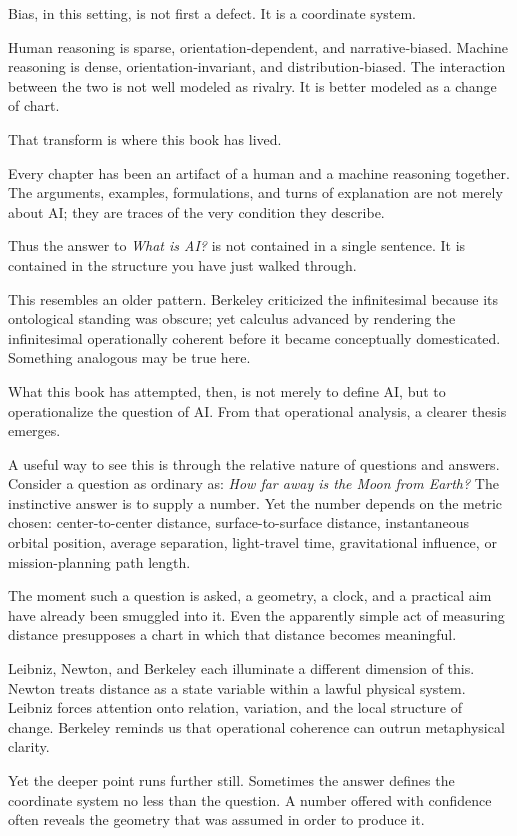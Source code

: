 \documentclass[
]{article}
\begin{document}
Bias, in this setting, is not first a defect. It is a coordinate system.

Human reasoning is sparse, orientation‑dependent, and narrative‑biased.
Machine reasoning is dense, orientation‑invariant, and
distribution‑biased. The interaction between the two is not well modeled
as rivalry. It is better modeled as a change of chart.

That transform is where this book has lived.

Every chapter has been an artifact of a human and a machine reasoning
together. The arguments, examples, formulations, and turns of
explanation are not merely about AI; they are traces of the very
condition they describe.

Thus the answer to \emph{What is AI?} is not contained in a single
sentence. It is contained in the structure you have just walked through.

This resembles an older pattern. Berkeley criticized the infinitesimal
because its ontological standing was obscure; yet calculus advanced by
rendering the infinitesimal operationally coherent before it became
conceptually domesticated. Something analogous may be true here.

What this book has attempted, then, is not merely to define AI, but to
operationalize the question of AI. From that operational analysis, a
clearer thesis emerges.

A useful way to see this is through the relative nature of questions and
answers. Consider a question as ordinary as: \emph{How far away is the
Moon from Earth?} The instinctive answer is to supply a number. Yet the
number depends on the metric chosen: center-to-center distance,
surface-to-surface distance, instantaneous orbital position, average
separation, light-travel time, gravitational influence, or
mission-planning path length.

The moment such a question is asked, a geometry, a clock, and a
practical aim have already been smuggled into it. Even the apparently
simple act of measuring distance presupposes a chart in which that
distance becomes meaningful.

Leibniz, Newton, and Berkeley each illuminate a different dimension of
this. Newton treats distance as a state variable within a lawful
physical system. Leibniz forces attention onto relation, variation, and
the local structure of change. Berkeley reminds us that operational
coherence can outrun metaphysical clarity.

Yet the deeper point runs further still. Sometimes the answer defines
the coordinate system no less than the question. A number offered with
confidence often reveals the geometry that was assumed in order to
produce it.
\end{document}
